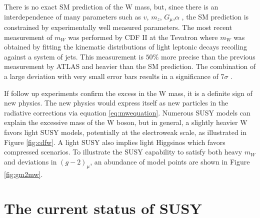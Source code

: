 There is no exact SM prediction of the W mass, but, since there is an interdependence of many parameters such as $v$, $m_z$, $G_\mu$,$\alpha$ , the SM prediction is constrained by experimentally well measured parameters. The most recent measurement of $m_W$ was performed by CDF II at the Tevatron where $m_W$ was obtained by fitting the kinematic distributions of light leptonic decays recoiling against a system of jets. This measurement is $50\%$ more precise than the previous measurement by ATLAS and heavier than the SM prediction. The combination of a large deviation with very small error bars results in a significance of $7\sigma$ \cite{CDF:2022hxs}.  

If follow up experiments confirm the excess in the W mass, it is a definite sign of new physics. The new physics would express itself as new particles in the radiative corrections via equation \ref{eq:mwequation}. Numerous SUSY models can explain the excessive mass of the W boson, but in general, a slightly heavier W favors light SUSY models, potentially at the electroweak scale, as illustrated in Figure \ref{fig:cdfw}. A light SUSY also implies light Higgsinos which favors compressed scenarios.  To illustrate the SUSY capability to satisfy both heavy $m_W$ and deviations in $(g-2)_\mu$, an abundance of model points are shown in Figure \ref{fig:gm2mw}.
\section{The current status of SUSY}

